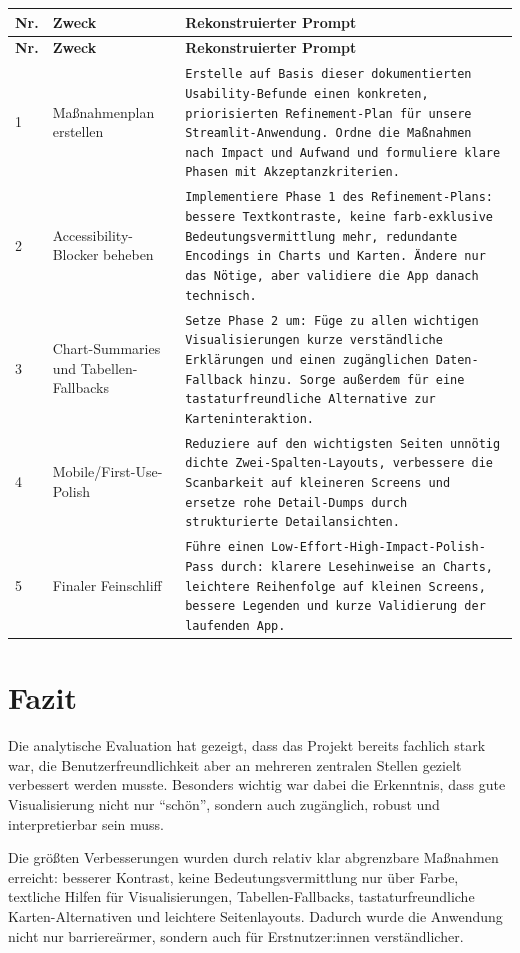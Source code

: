 \documentclass[11pt,a4paper]{article}
\begin{document}
\begin{longtable}{p{} p{} p{}}
\toprule
\textbf{Nr.} & \textbf{Zweck} & \textbf{Rekonstruierter Prompt} \\
\midrule
\endfirsthead
\toprule
\textbf{Nr.} & \textbf{Zweck} & \textbf{Rekonstruierter Prompt} \\
\midrule
\endhead
1 & Maßnahmenplan erstellen & \texttt{Erstelle auf Basis dieser dokumentierten Usability-Befunde einen konkreten, priorisierten Refinement-Plan für unsere Streamlit-Anwendung. Ordne die Maßnahmen nach Impact und Aufwand und formuliere klare Phasen mit Akzeptanzkriterien.} \\
2 & Accessibility-Blocker beheben & \texttt{Implementiere Phase 1 des Refinement-Plans: bessere Textkontraste, keine farb-exklusive Bedeutungsvermittlung mehr, redundante Encodings in Charts und Karten. Ändere nur das Nötige, aber validiere die App danach technisch.} \\
3 & Chart-Summaries und Tabellen-Fallbacks & \texttt{Setze Phase 2 um: Füge zu allen wichtigen Visualisierungen kurze verständliche Erklärungen und einen zugänglichen Daten-Fallback hinzu. Sorge außerdem für eine tastaturfreundliche Alternative zur Karteninteraktion.} \\
4 & Mobile/First-Use-Polish & \texttt{Reduziere auf den wichtigsten Seiten unnötig dichte Zwei-Spalten-Layouts, verbessere die Scanbarkeit auf kleineren Screens und ersetze rohe Detail-Dumps durch strukturierte Detailansichten.} \\
5 & Finaler Feinschliff & \texttt{Führe einen Low-Effort-High-Impact-Polish-Pass durch: klarere Lesehinweise an Charts, leichtere Reihenfolge auf kleinen Screens, bessere Legenden und kurze Validierung der laufenden App.} \\
\bottomrule
\end{longtable}

\section{Fazit}
Die analytische Evaluation hat gezeigt, dass das Projekt bereits fachlich stark war, die Benutzerfreundlichkeit aber an mehreren zentralen Stellen gezielt verbessert werden musste. Besonders wichtig war dabei die Erkenntnis, dass gute Visualisierung nicht nur ``schön'', sondern auch zugänglich, robust und interpretierbar sein muss.

Die größten Verbesserungen wurden durch relativ klar abgrenzbare Maßnahmen erreicht: besserer Kontrast, keine Bedeutungsvermittlung nur über Farbe, textliche Hilfen für Visualisierungen, Tabellen-Fallbacks, tastaturfreundliche Karten-Alternativen und leichtere Seitenlayouts. Dadurch wurde die Anwendung nicht nur barriereärmer, sondern auch für Erstnutzer:innen verständlicher.
\end{document}
